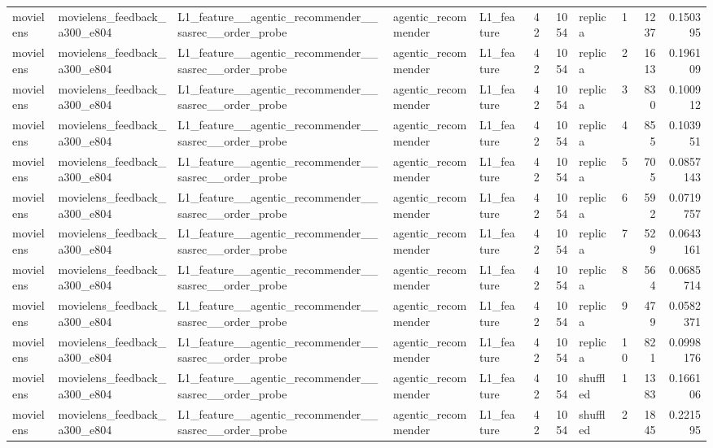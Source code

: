 \begin{table}[htbp!]
\begin{tabular}{lllllrrlrrr}
movielens & movielens\_feedback\_a300\_e804 & L1\_feature\_\_agentic\_recommender\_\_sasrec\_\_order\_probe & agentic\_recommender & L1\_feature & 42 & 1054 & replica & 1 & 1237 & 0.150395 \\
movielens & movielens\_feedback\_a300\_e804 & L1\_feature\_\_agentic\_recommender\_\_sasrec\_\_order\_probe & agentic\_recommender & L1\_feature & 42 & 1054 & replica & 2 & 1613 & 0.196109 \\
movielens & movielens\_feedback\_a300\_e804 & L1\_feature\_\_agentic\_recommender\_\_sasrec\_\_order\_probe & agentic\_recommender & L1\_feature & 42 & 1054 & replica & 3 & 830 & 0.100912 \\
movielens & movielens\_feedback\_a300\_e804 & L1\_feature\_\_agentic\_recommender\_\_sasrec\_\_order\_probe & agentic\_recommender & L1\_feature & 42 & 1054 & replica & 4 & 855 & 0.103951 \\
movielens & movielens\_feedback\_a300\_e804 & L1\_feature\_\_agentic\_recommender\_\_sasrec\_\_order\_probe & agentic\_recommender & L1\_feature & 42 & 1054 & replica & 5 & 705 & 0.0857143 \\
movielens & movielens\_feedback\_a300\_e804 & L1\_feature\_\_agentic\_recommender\_\_sasrec\_\_order\_probe & agentic\_recommender & L1\_feature & 42 & 1054 & replica & 6 & 592 & 0.0719757 \\
movielens & movielens\_feedback\_a300\_e804 & L1\_feature\_\_agentic\_recommender\_\_sasrec\_\_order\_probe & agentic\_recommender & L1\_feature & 42 & 1054 & replica & 7 & 529 & 0.0643161 \\
movielens & movielens\_feedback\_a300\_e804 & L1\_feature\_\_agentic\_recommender\_\_sasrec\_\_order\_probe & agentic\_recommender & L1\_feature & 42 & 1054 & replica & 8 & 564 & 0.0685714 \\
movielens & movielens\_feedback\_a300\_e804 & L1\_feature\_\_agentic\_recommender\_\_sasrec\_\_order\_probe & agentic\_recommender & L1\_feature & 42 & 1054 & replica & 9 & 479 & 0.0582371 \\
movielens & movielens\_feedback\_a300\_e804 & L1\_feature\_\_agentic\_recommender\_\_sasrec\_\_order\_probe & agentic\_recommender & L1\_feature & 42 & 1054 & replica & 10 & 821 & 0.0998176 \\
movielens & movielens\_feedback\_a300\_e804 & L1\_feature\_\_agentic\_recommender\_\_sasrec\_\_order\_probe & agentic\_recommender & L1\_feature & 42 & 1054 & shuffled & 1 & 1383 & 0.166106 \\
movielens & movielens\_feedback\_a300\_e804 & L1\_feature\_\_agentic\_recommender\_\_sasrec\_\_order\_probe & agentic\_recommender & L1\_feature & 42 & 1054 & shuffled & 2 & 1845 & 0.221595 \\

\end{tabular}
\end{table}

